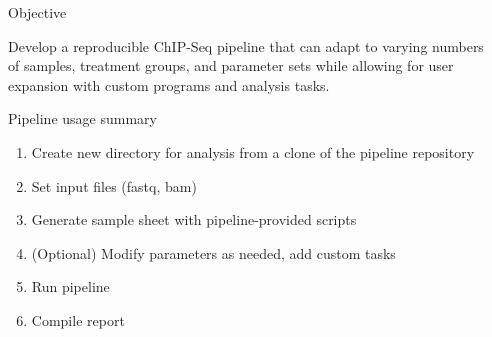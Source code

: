 \documentclass[final]{beamer}
\newlength{\sepwid}
\newlength{\onecolwid}
\begin{document}
\begin{frame}[t] %

\begin{columns}[t] %

\begin{column}{\sepwid}\end{column} %

\begin{column}{\onecolwid} %


\begin{beamerboxesrounded}{Objective}

Develop a reproducible ChIP-Seq pipeline that can adapt to varying numbers of samples, treatment groups, and parameter sets while allowing for user expansion with custom programs and analysis tasks. 

\end{beamerboxesrounded}\hfill

%	


\begin{beamerboxesrounded}{Pipeline usage summary}


\begin{enumerate}
\item Create new directory for analysis from a clone of the pipeline repository
\item Set input files (fastq, bam)
\item Generate sample sheet with pipeline-provided scripts
\item (Optional) Modify parameters as needed, add custom tasks
\item Run pipeline
\item Compile report
\end{enumerate}


\end{beamerboxesrounded}
\end{column}
\end{columns}
\end{frame}
\end{document}
